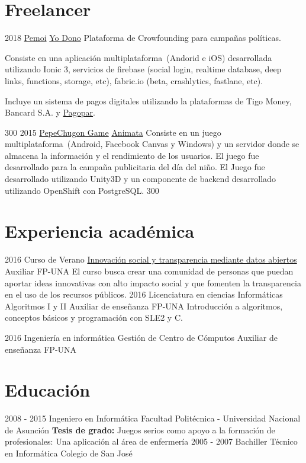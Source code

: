 \documentclass[]{friggeri-cv}
\begin{document}
\section{Freelancer}
\proyectof
    {2018}
    {\href{https://www.pemoi.com.py}{Pemoi}}
    {\href{https://www.pemoi.com.py/}{Yo Dono}}
    {Plataforma de Crowfounding para campañas políticas.}
    {Consiste en una aplicación multiplataforma~(Andorid e iOS) desarrollada utilizando
     Ionic 3, servicios de firebase (social login, realtime database, deep links, functions, 
     storage, etc), fabric.io (beta, crashlytics, fastlane, etc).
     
     Incluye un sistema de pagos digitales utilizando la plataformas de
     Tigo Money, Bancard S.A. y \href{https://www.pagopar.com.py}{Pagopar}.
     
     }
    {300}
\proyectof
    {2015}
    {\href{https://apps.facebook.com/pechugon_pepe}{PepeChugon Game}}
    {\href{http://www.animata.com.py/}{Animata}}
    {Consiste en un juego multiplataforma~(Android, Facebook Canvas y Windows)
        y un servidor donde se almacena la información y el rendimiento de los
        usuarios. El juego fue desarrollado para la campaña publicitaria del día
        del niño.}
    {El Juego fue desarrollado utilizando Unity3D y un componente de backend 
    desarrollado utilizando OpenShift con PostgreSQL.}
    {300}
        

\section{Experiencia académica}
\clase
    {2016}
    {Curso de Verano}
    {\href{http://www.pol.una.py/cursosverano/index.php?option=com_content&view=article&layout=edit&id=91}{Innovación
            social y transparencia mediante datos abiertos}} 
    {Auxiliar}
    {FP-UNA}
    {El curso busca crear una comunidad de personas que puedan aportar ideas
        innovativas con alto impacto social y que fomenten la transparencia en
        el uso de los recursos públicos. }
\clase
    {2016}
    {Licenciatura en ciencias Informáticas}
    {Algoritmos I y II} 
    {Auxiliar de enseñanza}
    {FP-UNA}
    {Introducción a algoritmos, conceptos básicos y programación con SLE2 y C.}

\clase
    {2016}
    {Ingeniería en informática}
    {Gestión de Centro de Cómputos} 
    {Auxiliar de enseñanza}
    {FP-UNA}
    {}

\section{Educación}
\begin{entrylist}
  \educacion
    {2008 - 2015}
    {Ingeniero en Informática}
    {Facultad Politécnica - Universidad Nacional de Asunción}
    {\textbf{Tesis de grado:} Juegos serios como apoyo a la formación de profesionales: Una aplicación al área de enfermería}
  \educacion
    {2005 - 2007}
    {Bachiller Técnico en Informática}
    {Colegio de San José}
    {}
\end{entrylist}
\end{document}

